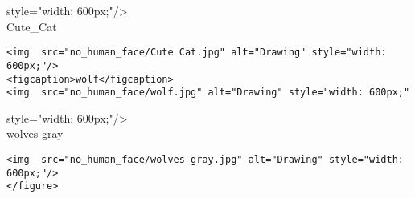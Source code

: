 \documentclass[11pt]{article}
\begin{document}
style="width: 600px;"/\textgreater{}\\

Cute\_Cat

\begin{verbatim}
<img  src="no_human_face/Cute Cat.jpg" alt="Drawing" style="width: 600px;"/>
<figcaption>wolf</figcaption>
<img  src="no_human_face/wolf.jpg" alt="Drawing" style="width: 600px;"
\end{verbatim}

style="width: 600px;"/\textgreater{}\\

wolves gray

\begin{verbatim}
<img  src="no_human_face/wolves gray.jpg" alt="Drawing" style="width: 600px;"/>    
</figure>   
\end{verbatim}


    
    
    
    
\end{document}
